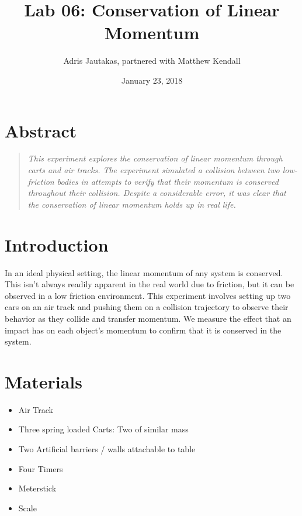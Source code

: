 \documentclass[12pt]{article}
\title{Lab 06: Conservation of Linear Momentum}
\author{Adris Jautakas, partnered with Matthew Kendall}
\date{January 23, 2018}
\begin{document}
   \maketitle

    \pagebreak

    \section*{Abstract}
        \begin{quote}
        {\textit {\small 
            This experiment explores the conservation of linear momentum through
            carts and air tracks. The experiment simulated a collision between
            two low-friction bodies in attempts to verify that their momentum
            is conserved throughout their collision. Despite a considerable
            error, it was clear that the conservation of linear momentum
            holds up in real life.
        } }
        \end{quote}

    \section{Introduction}
        In an ideal physical setting, the linear momentum of any system is conserved.
        This isn't always readily apparent in the real world due to friction, but
        it can be observed in a low friction environment. This experiment involves
        setting up two cars on an air track and pushing them on a collision trajectory
        to observe their behavior as they collide and transfer momentum. We measure
        the effect that an impact has on each object's momentum to confirm that it
        is conserved in the system.
    \section{Materials}
        \begin{itemize}
            \item Air Track
            \item Three spring loaded Carts: Two of similar mass
            \item Two Artificial barriers / walls attachable to table
            \item Four Timers
            \item Meterstick
            \item Scale
        \end{itemize}
    
\end{document}
